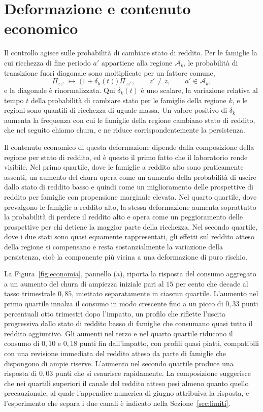\documentclass[11pt,a4paper]{article}
\begin{document}
\section{Deformazione e contenuto economico}\label{sec:deformazione}
Il controllo agisce sulle probabilità di cambiare stato di reddito. Per le famiglie la cui ricchezza di fine periodo $a'$ appartiene alla regione $\mathcal{A}_k$, le probabilità di transizione fuori diagonale sono moltiplicate per un fattore comune,
\begin{equation}\label{eq:tilt}
\Pi_{zz'}\;\longmapsto\;\big(1+\delta_k(t)\big)\,\Pi_{zz'},\qquad z'\neq z,\qquad a'\in\mathcal{A}_k,
\end{equation}
e la diagonale è rinormalizzata. Qui $\delta_k(t)$ è uno scalare, la variazione relativa al tempo $t$ della probabilità di cambiare stato per le famiglie della regione $k$, e le regioni sono quantili di ricchezza di uguale massa. Un valore positivo di $\delta_k$ aumenta la frequenza con cui le famiglie della regione cambiano stato di reddito, che nel seguito chiamo churn, e ne riduce corrispondentemente la persistenza.

Il contenuto economico di questa deformazione dipende dalla composizione della regione per stato di reddito, ed è questo il primo fatto che il laboratorio rende visibile. Nel primo quartile, dove le famiglie a reddito alto sono praticamente assenti, un aumento del churn opera come un aumento della probabilità di uscire dallo stato di reddito basso e quindi come un miglioramento delle prospettive di reddito per famiglie con propensione marginale elevata. Nel quarto quartile, dove prevalgono le famiglie a reddito alto, la stessa deformazione aumenta soprattutto la probabilità di perdere il reddito alto e opera come un peggioramento delle prospettive per chi detiene la maggior parte della ricchezza. Nel secondo quartile, dove i due stati sono quasi equamente rappresentati, gli effetti sul reddito atteso della regione si compensano e resta sostanzialmente la variazione della persistenza, cioè la componente più vicina a una deformazione di puro rischio.

La Figura~\ref{fig:economia}, pannello (a), riporta la risposta del consumo aggregato a un aumento del churn di ampiezza iniziale pari al $15$ per cento che decade al tasso trimestrale $0{,}85$, iniettato separatamente in ciascun quartile. L'aumento nel primo quartile innalza il consumo in modo crescente fino a un picco di $0{,}33$ punti percentuali otto trimestri dopo l'impatto, un profilo che riflette l'uscita progressiva dallo stato di reddito basso di famiglie che consumano quasi tutto il reddito aggiuntivo. Gli aumenti nel terzo e nel quarto quartile riducono il consumo di $0{,}10$ e $0{,}18$ punti fin dall'impatto, con profili quasi piatti, compatibili con una revisione immediata del reddito atteso da parte di famiglie che dispongono di ampie riserve. L'aumento nel secondo quartile produce una risposta di $0{,}03$ punti che si esaurisce rapidamente. La composizione suggerisce che nei quartili superiori il canale del reddito atteso pesi almeno quanto quello precauzionale, al quale l'appendice numerica di giugno attribuiva la risposta, e l'esperimento che separa i due canali è indicato nella Sezione~\ref{sec:limiti}.
\end{document}
